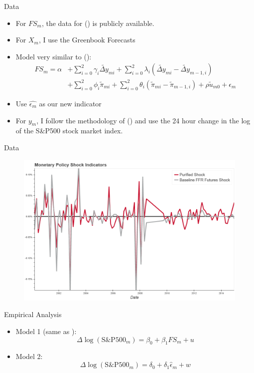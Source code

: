 \documentclass[xcolor=dvipsnames, compress, t]{beamer}
\begin{document}
	\begin{frame}{Data}
		\begin{itemize}
			\item<2-> For \(FS_m\), the data for \citeauthor{Nakamura2018} (\citeyear{Nakamura2018}) is publicly available.
			\item<3-> For \(X_m\), I use the Greenbook Forecasts
			\item<4-> Model very similar to \citeauthor{Romer2004} (\citeyear{Romer2004}):
			\begin{align*}
				FS_m =  \alpha &+ \sum_{i=0}^{2} \gamma_i \widetilde{\Delta y}_{mi} + \sum^2_{i=0} \lambda_i \left(\widetilde{\Delta y}_{mi}-\widetilde{\Delta y}_{m-1,i}\right)\\
				&+\sum^{2}_{i=0} \phi_i \tilde{\pi}_{mi} + \sum^2_{i=0} \theta_i \left(\tilde{ \pi}_{mi}-\tilde{ \pi}_{m-1,i}\right) + \rho \tilde{u}_{m0} + \epsilon_m
			\end{align*}
			\item<5-> Use \(\hat{\epsilon_m}\) as our new indicator
			\item<6-> For \(y_m\), I follow the methodology of \citeauthor{Bauer2020} (\citeauthor{Bauer2020}) and use the 24 hour change in the log of the S\&P500 stock market index. 
		\end{itemize}
	\end{frame}
	\begin{frame}{Data}
		\begin{figure}
			\includegraphics[width=.90\textwidth]{charts/pure_indicator.png}
		\end{figure}
	\end{frame}
	\begin{frame}{Empirical Analysis}
		\begin{itemize} 
			\item<2-> Model 1 (same as \cite{Bauer2020}):
				\[
					\Delta \log{(\text{S\&P500}_m)} = \beta_0 + \beta_1 FS_m + u 
				\]
			\item<3-> Model 2: 
				\[
					\Delta \log{(\text{S\&P500}_m)} = \delta_0 + \delta_1 \hat{\epsilon}_m + w
				\]
		\end{itemize}
	\end{frame}
\end{document}
